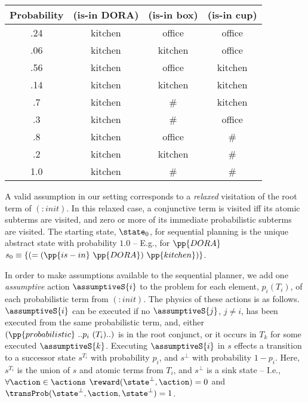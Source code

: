 \small
\begin{tabular}{cccc}
\hline
Probability & (is-in DORA)  & (is-in box)  & (is-in cup) \\
\hline
.24 & kitchen & office & office \\
.06 & kitchen & kitchen & office \\
.56 & kitchen & office & kitchen \\
.14 & kitchen & kitchen & kitchen \\
.7 & kitchen & \# &  kitchen\\
.3 & kitchen & \# & office \\
.8 & kitchen & office & \# \\
.2 & kitchen & kitchen & \# \\
1.0 & kitchen & \# & \# \\
\hline
\end{tabular}
\normalsize

\noindent A valid assumption in our setting corresponds to a {\em
relaxed} visitation of the root term of $(:init)$. In this relaxed
case, a conjunctive term is visited iff its atomic subterms are
visited, and zero or more of its immediate probabilistic subterms are
visited. The starting state, $\state_0$, for sequential planning is
the unique abstract state with probability $1.0$ -- E.g., for
$\pp{DORA}$ $s_0 \equiv \{(= (\pp{is-in}~\pp{DORA})~\pp{kitchen})\}$.

In order to make assumptions available to the sequential planner, we
add one {\em assumptive} action $\assumptiveS{i}$ to the problem for
each element, $p_i (T_i)$, of each probabilistic term from
$(:init)$. The physics of these actions is as
follows. $\assumptiveS{i}$ can be executed if no $\assumptiveS{j}$,
$j \neq i$, has been executed from the same probabilistic term, and,
either $(\pp{probabilistic}~..p_i~(T_i)..)$ is in the root conjunct,
or it occurs in $T_k$ for some executed $\assumptiveS{k}$.
Executing $\assumptiveS{i}$ in $s$ effects a transition to a
successor state $s^{T_i}$ with probability $p_i$, and $s^\bot$ with
probability $1 - p_i$. Here, $s^{T_i}$ is the union of $s$ and atomic
terms from $T_i$, and $s^\bot$ is a sink state -- I.e.,
$\forall\action\in\actions$ $\reward(\state^\bot, \action) = 0$ and
$\transProb(\state^\bot, \action, \state^\bot) = 1$.


